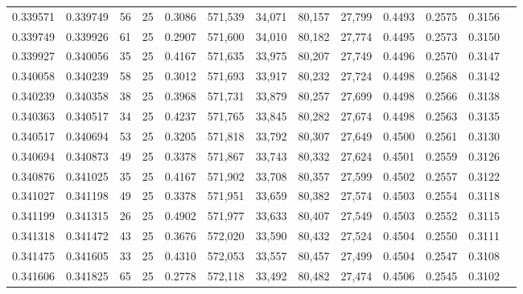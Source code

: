 \begin{tabular}{rrrrrrrrrrrrr}
0.339571 & 0.339749 &    56 &  25 &                                     0.3086 & 571,539 &  34,071 &  80,157 &  27,799 & 0.4493 & 0.2575 & 0.3156 \\
0.339749 & 0.339926 &    61 &  25 &                                     0.2907 & 571,600 &  34,010 &  80,182 &  27,774 & 0.4495 & 0.2573 & 0.3150 \\
0.339927 & 0.340056 &    35 &  25 &                                     0.4167 & 571,635 &  33,975 &  80,207 &  27,749 & 0.4496 & 0.2570 & 0.3147 \\
0.340058 & 0.340239 &    58 &  25 &                                     0.3012 & 571,693 &  33,917 &  80,232 &  27,724 & 0.4498 & 0.2568 & 0.3142 \\
0.340239 & 0.340358 &    38 &  25 &                                     0.3968 & 571,731 &  33,879 &  80,257 &  27,699 & 0.4498 & 0.2566 & 0.3138 \\
0.340363 & 0.340517 &    34 &  25 &                                     0.4237 & 571,765 &  33,845 &  80,282 &  27,674 & 0.4498 & 0.2563 & 0.3135 \\
0.340517 & 0.340694 &    53 &  25 &                                     0.3205 & 571,818 &  33,792 &  80,307 &  27,649 & 0.4500 & 0.2561 & 0.3130 \\
0.340694 & 0.340873 &    49 &  25 &                                     0.3378 & 571,867 &  33,743 &  80,332 &  27,624 & 0.4501 & 0.2559 & 0.3126 \\
0.340876 & 0.341025 &    35 &  25 &                                     0.4167 & 571,902 &  33,708 &  80,357 &  27,599 & 0.4502 & 0.2557 & 0.3122 \\
0.341027 & 0.341198 &    49 &  25 &                                     0.3378 & 571,951 &  33,659 &  80,382 &  27,574 & 0.4503 & 0.2554 & 0.3118 \\
0.341199 & 0.341315 &    26 &  25 &                                     0.4902 & 571,977 &  33,633 &  80,407 &  27,549 & 0.4503 & 0.2552 & 0.3115 \\
0.341318 & 0.341472 &    43 &  25 &                                     0.3676 & 572,020 &  33,590 &  80,432 &  27,524 & 0.4504 & 0.2550 & 0.3111 \\
0.341475 & 0.341605 &    33 &  25 &                                     0.4310 & 572,053 &  33,557 &  80,457 &  27,499 & 0.4504 & 0.2547 & 0.3108 \\
0.341606 & 0.341825 &    65 &  25 &                                     0.2778 & 572,118 &  33,492 &  80,482 &  27,474 & 0.4506 & 0.2545 & 0.3102 \\

\end{tabular}
